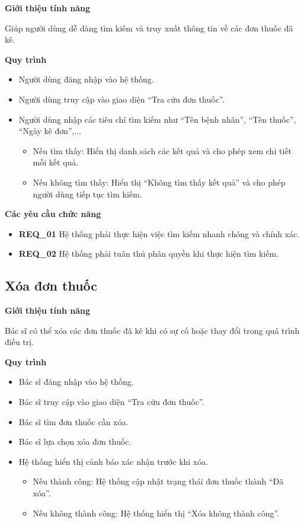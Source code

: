 \noindent \textbf{Giới thiệu tính năng}

Giúp người dùng dễ dàng tìm kiếm và truy xuất thông tin về các đơn thuốc đã kê.

\noindent \textbf{Quy trình}
\begin{itemize}
    \item Người dùng đăng nhập vào hệ thống.
    \item Người dùng truy cập vào giao diện ``Tra cứu đơn thuốc''.
    \item Người dùng nhập các tiêu chí tìm kiếm như ``Tên bệnh nhân'', ``Tên thuốc'', ``Ngày kê đơn'',...
    \begin{itemize}
        \item Nếu tìm thấy: Hiển thị danh sách các kết quả và cho phép xem chi tiết mỗi kết quả.
        \item Nếu không tìm thấy: Hiển thị ``Không tìm thấy kết quả'' và cho phép người dùng tiếp tục tìm kiếm.
    \end{itemize}
\end{itemize}

\noindent \textbf{Các yêu cầu chức năng}
\begin{itemize}
    \item \textbf{REQ\_01} Hệ thống phải thực hiện việc tìm kiếm nhanh chóng và chính xác.
    \item \textbf{REQ\_02} Hệ thống phải tuân thủ phân quyền khi thực hiện tìm kiếm.
\end{itemize}

\subsection{Xóa đơn thuốc}

\noindent \textbf{Giới thiệu tính năng}

Bác sĩ có thể xóa các đơn thuốc đã kê khi có sự cố hoặc thay đổi trong quá trình điều trị.

\noindent \textbf{Quy trình}
\begin{itemize}
    \item Bác sĩ đăng nhập vào hệ thống.
    \item Bác sĩ truy cập vào giao diện ``Tra cứu đơn thuốc''.
    \item Bác sĩ tìm đơn thuốc cần xóa.
    \item Bác sĩ lựa chọn xóa đơn thuốc.
    \item Hệ thống hiển thị cảnh báo xác nhận trước khi xóa.
    \begin{itemize}
        \item Nếu thành công: Hệ thống cập nhật trạng thái đơn thuốc thành ``Đã xóa''.
        \item Nếu không thành công: Hệ thống hiển thị ``Xóa không thành công''.
    \end{itemize}
\end{itemize}

